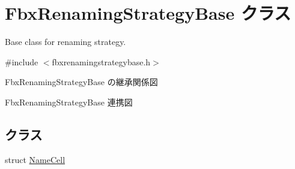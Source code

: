 \hypertarget{class_fbx_renaming_strategy_base}{}\section{Fbx\+Renaming\+Strategy\+Base クラス}
\label{class_fbx_renaming_strategy_base}


Base class for renaming strategy.  




{\ttfamily \#include $<$fbxrenamingstrategybase.\+h$>$}



Fbx\+Renaming\+Strategy\+Base の継承関係図


Fbx\+Renaming\+Strategy\+Base 連携図
\subsection*{クラス}
\begin{DoxyCompactItemize}
\item 
struct \hyperlink{struct_fbx_renaming_strategy_base_1_1_name_cell}{Name\+Cell}
\end{DoxyCompactItemize}
